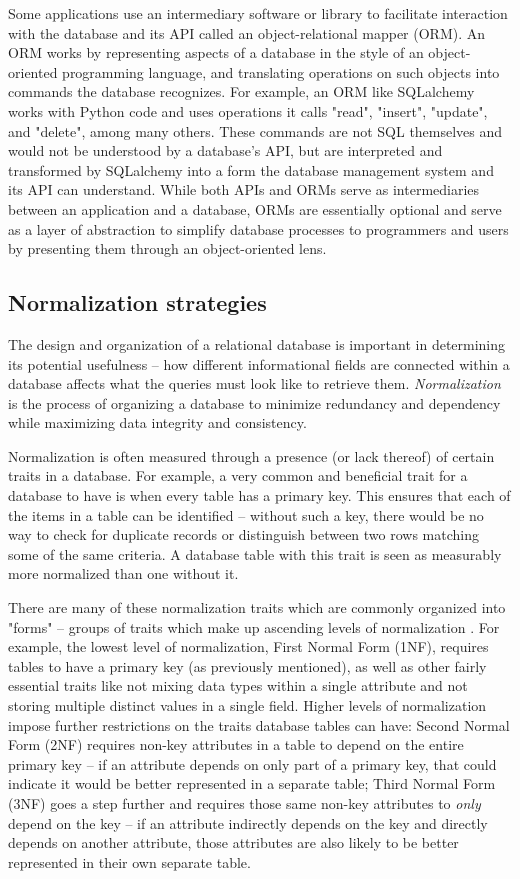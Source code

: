 Some applications use an intermediary software or library to facilitate interaction with the database and its API called an object-relational mapper (ORM). An ORM works by representing aspects of a database in the style of an object-oriented programming language, and translating operations on such objects into commands the database recognizes. For example, an ORM like SQLalchemy works with Python code and uses operations it calls "read", "insert", "update", and "delete", among many others. These commands are not SQL themselves and would not be understood by a database's API, but are interpreted and transformed by SQLalchemy into a form the database management system and its API can understand. While both APIs and ORMs serve as intermediaries between an application and a database, ORMs are essentially optional and serve as a layer of abstraction to simplify database processes to programmers and users by presenting them through an object-oriented lens.

\subsection{Normalization strategies}

The design and organization of a relational database is important in determining its potential usefulness -- how different informational fields are connected within a database affects what the queries must look like to retrieve them. \textit{Normalization} is the process of organizing a database to minimize redundancy and dependency while maximizing data integrity and consistency.

Normalization is often measured through a presence (or lack thereof) of certain traits in a database. For example, a very common and beneficial trait for a database to have is when every table has a primary key. This ensures that each of the items in a table can be identified -- without such a key, there would be no way to check for duplicate records or distinguish between two rows matching some of the same criteria. A database table with this trait is seen as measurably more normalized than one without it.

There are many of these normalization traits which are commonly organized into "forms" -- groups of traits which make up ascending levels of normalization \cite{hao_grokking_2025}. For example, the lowest level of normalization, First Normal Form (1NF), requires tables to have a primary key (as previously mentioned), as well as other fairly essential traits like not mixing data types within a single attribute and not storing multiple distinct values in a single field. Higher levels of normalization impose further restrictions on the traits database tables can have: Second Normal Form (2NF) requires non-key attributes in a table to depend on the entire primary key -- if an attribute depends on only part of a primary key, that could indicate it would be better represented in a separate table; Third Normal Form (3NF) goes a step further and requires those same non-key attributes to \textit{only} depend on the key -- if an attribute indirectly depends on the key and directly depends on another attribute, those attributes are also likely to be better represented in their own separate table.

